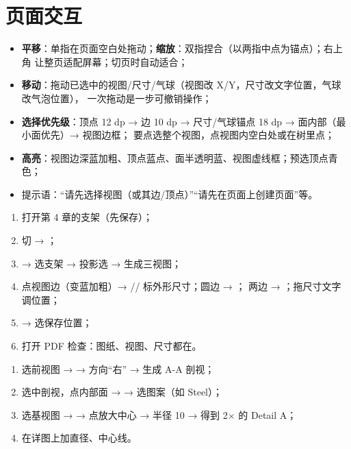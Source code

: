 \section{页面交互}

\begin{itemize}
  \item \textbf{平移}：单指在页面空白处拖动；\textbf{缩放}：双指捏合（以两指中点为锚点）；右上角
         让整页适配屏幕；切页时自动适合；
  \item \textbf{移动}：拖动已选中的视图/尺寸/气球（视图改 X/Y，尺寸改文字位置，气球改气泡位置），
        一次拖动是一步可撤销操作；
  \item \textbf{选择优先级}：顶点 12 dp → 边 10 dp → 尺寸/气球锚点 18 dp → 面内部（最小面优先）→ 视图边框；
        要点选整个视图，点视图内空白处或在树里点；
  \item \textbf{高亮}：视图边深蓝加粗、顶点蓝点、面半透明蓝、视图虚线框；预选顶点青色；
  \item 提示语：“请先选择视图（或其边/顶点）”“请先在页面上创建页面”等。
\end{itemize}

\begin{practice}
\begin{enumerate}
  \item 打开第 4 章的支架（先保存）；
  \item 切  → ；
  \item {} → 选支架 → 投影选  → 生成三视图；
  \item 点视图边（变蓝加粗）→ // 标外形尺寸；圆边 → ；
        两边 → ；拖尺寸文字调位置；
  \item {} → 选保存位置；
  \item 打开 PDF 检查：图纸、视图、尺寸都在。
\end{enumerate}
\end{practice}

\begin{practice}[练习：剖视与局部放大]
\begin{enumerate}
  \item 选前视图 →  → 方向“右” → 生成 A-A 剖视；
  \item 选中剖视，点内部面 →  → 选图案（如 Steel）；
  \item 选基视图 →  → 点放大中心 → 半径 10 → 得到 2× 的 Detail A；
  \item 在详图上加直径、中心线。
\end{enumerate}
\end{practice}

